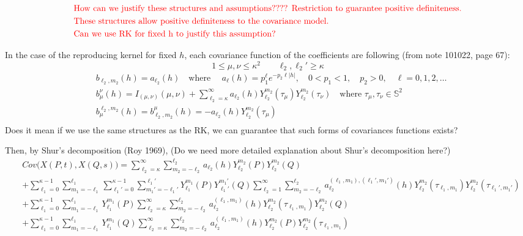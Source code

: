 \documentclass[11pt]{article}
\begin{document}
\begin{itemize}
\begin{align*}
&\text{\color{red} How can we justify these structures and assumptions???? Restriction to guarantee positive definiteness.}\\
&\text{\color{red} These structures allow positive definiteness to the covariance model.}\\
&\text{\color{red} Can we use RK for fixed h to justify this assumption?}\\
\end{align*}

{\color{red}
In the case of the reproducing kernel for fixed $h$, each covariance function of the coefficients are following (from note 101022, page 67): \\
$$1 \le \mu, \nu \le \kappa^2 \quad \quad \ell_2, {\ell_2}'  \ge \kappa$$ 
\begin{align*}
&b_{\ell_2,m_2}(h) = a_{\ell_2}(h) \quad \text{where } \quad a_\ell(h)=p_1^\ell e^{-p_2 \ell |h|}, \quad 0<p_1<1, \quad p_2>0, \quad \ell=0,1,2,\dots\\
&b_{\mu}^{\nu}(h) = I_{(\mu, \nu)}(\mu, \nu) + \sum_{\ell_2=\kappa}^{\infty} a_{\ell_2}(h) Y_{\ell_2}^{m_2}(\tau_\mu) Y_{\ell_2}^{m_2}(\tau_\nu)  \quad \text{where } \tau_\mu, \tau_\nu \in \mathbb{S}^2 \\
&b_{\mu}^{\ell_2,m_2}(h) = b_{\ell_2,m_2}^{\mu}(h) = -a_{\ell_2}(h) Y_{\ell_2}^{m_2}(\tau_\mu)\\
\end{align*}
Does it mean if we use the same structures as the RK, we can guarantee that such forms of covariances functions exists?\\
}

\pagebreak


Then, by Shur's decomposition (Roy 1969), {\color{red} (Do we need more detailed explanation about Shur's decomposition here?)}\\
\begin{align*}
&Cov\biggl(X(P,t), X(Q,s)\biggl) = \sum_{\ell_2=\kappa}^{\infty} \sum_{m_2=-\ell_2}^{\ell_2} a_{\ell_2}(h) Y_{\ell_2}^{m_2}(P) Y_{\ell_2}^{m_2}(Q)\\ 
&+ \sum_{\ell_1=0}^{\kappa-1} \sum_{m_1=-\ell_1}^{\ell_1} \sum_{\ell_1'=0}^{\kappa-1} \sum_{m_1'=-\ell_1'}^{\ell_1'} Y_{\ell_1}^{m_1}(P) Y_{\ell_1'}^{m_1'}(Q) \sum_{\ell_2=1}^{\infty} \sum_{m_2=-\ell_2}^{\ell_2}  a_{\ell_2}^{(\ell_1,m_1),(\ell_1',m_1')}(h) Y_{\ell_2}^{m_2}(\tau_{\ell_1,m_1}) Y_{\ell_2}^{m_2}(\tau_{\ell_1',m_1'})\\
&+ \sum_{\ell_1=0}^{\kappa-1} \sum_{m_1=-\ell_1}^{\ell_1} Y_{\ell_1}^{m_1}(P) \sum_{\ell_2=\kappa}^{\infty} \sum_{m_2=-\ell_2}^{\ell_2}  a_{\ell_2}^{(\ell_1,m_1)} (h) Y_{\ell_2}^{m_2}(\tau_{\ell_1,m_1}) Y_{\ell_2}^{m_2}(Q)\\ 
&+ \sum_{\ell_1=0}^{\kappa-1} \sum_{m_1=-\ell_1}^{\ell_1} Y_{\ell_1}^{m_1}(Q) \sum_{\ell_2=\kappa}^{\infty} \sum_{m_2=-\ell_2}^{\ell_2}  a_{\ell_2}^{(\ell_1,m_1)} (h) Y_{\ell_2}^{m_2}(P) Y_{\ell_2}^{m_2}(\tau_{\ell_1,m_1})\\
\end{align*}


\end{itemize}
\end{document}

